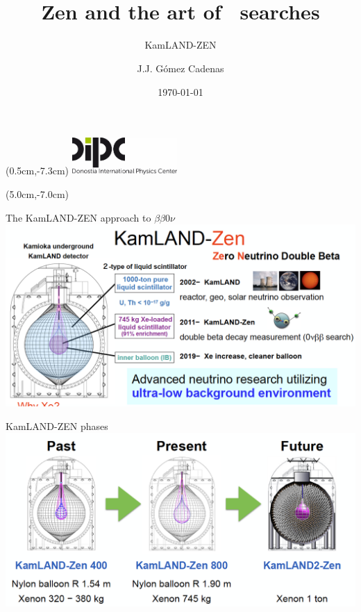 \documentclass [aspectratio=169]{beamer}
\title[]{\vspace{60pt} \\
Zen and the art of \bbonu\ searches} %
\subtitle{KamLAND-ZEN}
\author[]{J.J. Gómez Cadenas}
\institute[]{Donostia International Physics Center}
\date{\today}
\newcommand{\bbonu}{\ensuremath{\beta\beta0\nu}}
\begin{document}
{
\begin{frame}
    \titlepage
    \begin{textblock*}{4cm}(0.5cm,-7.3cm)
        \includegraphics[width=4cm]{dipc.png}
    \end{textblock*}
    \begin{textblock*}{8cm}(5.0cm,-7.0cm)
        \huge {} %
    \end{textblock*}
\end{frame}
}


\begin{frame}{The KamLAND-ZEN approach to \bbonu}
\includegraphics[scale=0.3]{kzen.png}
\end{frame}

\begin{frame}{KamLAND-ZEN phases}
\includegraphics[scale=0.30]{kzenPhases.png}
\end{frame}
\end{document}
